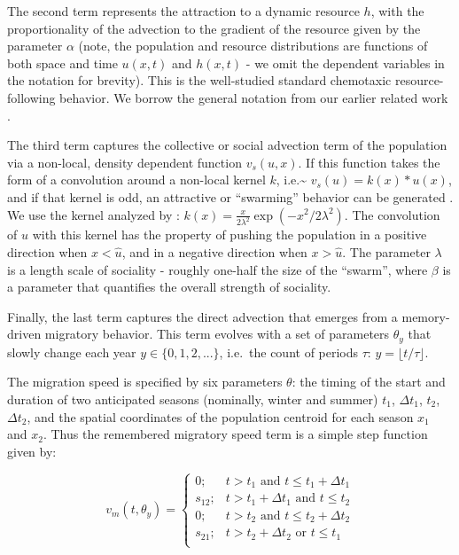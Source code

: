 \documentclass[utf8]{frontiersSCNS} %
\begin{document}
The second term represents the attraction to a dynamic resource $h$, with the proportionality of the advection to the gradient of the resource given by the parameter $\alpha$ (note, the population and resource distributions are functions of both space and time $u(x,t)$ and $h(x,t)$ - we omit the dependent variables in the notation for brevity). This is the well-studied standard chemotaxic resource-following behavior. We borrow the general notation from our earlier related work \citep{Fagan2017, Fagan2019}.

The third term captures the collective or social advection term of the population via a non-local, density dependent function $v_s(u,x)$. If this function takes the form of a convolution around a non-local kernel $k$, i.e.\textasciitilde{} $v_s(u) = k(x) * u(x)$, and if that kernel is odd, an attractive or ``swarming'' behavior can be generated \citep{Mogilner1999}. We use the kernel analyzed by \citet{Mogilner1999}: $k(x) = \frac{x}{2\lambda^2} \exp(-x^2/2\lambda^2).$ The convolution of $u$ with this kernel has the property of pushing the population in a positive direction when $x < \widehat{u}$, and in a negative direction when $x > \widehat{u}$. The parameter $\lambda$ is a length scale of sociality - roughly one-half the size of the ``swarm'', where $\beta$ is a parameter that quantifies the overall strength of sociality.

Finally, the last term captures the direct advection that emerges from a memory-driven migratory behavior. This term evolves with a set of parameters $\theta_y$ that slowly change each year $y \in \{0,1,2,...\}$, i.e.~the count of periods $\tau$: $y = \lfloor t/\tau \rfloor$.

The migration speed is specified by six parameters $\theta$: the timing of the start and duration of two anticipated seasons (nominally, winter and summer) $t_1$, $\Delta t_1$, $t_2$, $\Delta t_2$, and the spatial coordinates of the population centroid for each season $x_1$ and $x_2$. Thus the remembered migratory speed term is a simple step function given by:

\begin{equation}
	v_m(t, \theta_y) = \begin{cases}
		0; & t > t_1  \,\, \text{and} \,\, t \leq t_1 + \Delta t_1 \\ 
		s_{12}; & t > t_1 + \Delta t_1 \,\, \text{and} \,\,  t \leq t_2 \\ 
		0; & t> t_2 \,\, \text{and} \,\, t \leq t_2 + \Delta t_2 \\ 
		s_{21}; &  t > t_2+\Delta t_2 \,\, \text{or} \,\, t \leq t_1\\ 
	\end{cases}
\end{equation}
\end{document}
